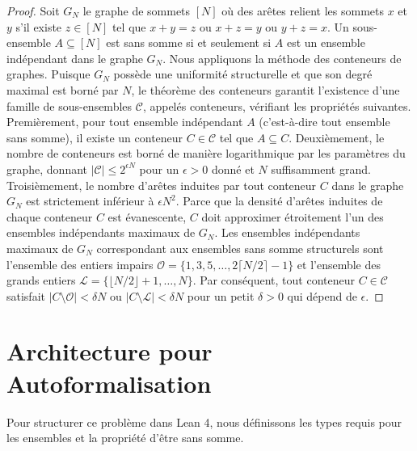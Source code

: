\documentclass[12pt, a4paper]{article}
\begin{document}
\begin{proof}
Soit $G_N$ le graphe de sommets $[N]$ o\`u des ar\^etes relient les sommets $x$ et $y$ s'il existe $z \in [N]$ tel que $x+y=z$ ou $x+z=y$ ou $y+z=x$.
Un sous-ensemble $A \subseteq [N]$ est sans somme si et seulement si $A$ est un ensemble ind\'ependant dans le graphe $G_N$.
Nous appliquons la m\'ethode des conteneurs de graphes. Puisque $G_N$ poss\`ede une uniformit\'e structurelle et que son degr\'e maximal est born\'e par $N$, le th\'eor\`eme des conteneurs garantit l'existence d'une famille de sous-ensembles $\mathcal{C}$, appel\'es conteneurs, v\'erifiant les propri\'et\'es suivantes.
Premi\`erement, pour tout ensemble ind\'ependant $A$ (c'est-\`a-dire tout ensemble sans somme), il existe un conteneur $C \in \mathcal{C}$ tel que $A \subseteq C$.
Deuxi\`emement, le nombre de conteneurs est born\'e de mani\`ere logarithmique par les param\`etres du graphe, donnant $|\mathcal{C}| \le 2^{\epsilon N}$ pour un $\epsilon > 0$ donn\'e et $N$ suffisamment grand.
Troisi\`emement, le nombre d'ar\^etes induites par tout conteneur $C$ dans le graphe $G_N$ est strictement inf\'erieur \`a $\epsilon N^2$.
Parce que la densit\'e d'ar\^etes induites de chaque conteneur $C$ est \'evanescente, $C$ doit approximer \'etroitement l'un des ensembles ind\'ependants maximaux de $G_N$.
Les ensembles ind\'ependants maximaux de $G_N$ correspondant aux ensembles sans somme structurels sont l'ensemble des entiers impairs $\mathcal{O} = \{1, 3, 5, \dots, 2\lceil N/2 \rceil - 1\}$ et l'ensemble des grands entiers $\mathcal{L} = \{\lfloor N/2 \rfloor + 1, \dots, N\}$.
Par cons\'equent, tout conteneur $C \in \mathcal{C}$ satisfait $|C \setminus \mathcal{O}| < \delta N$ ou $|C \setminus \mathcal{L}| < \delta N$ pour un petit $\delta > 0$ qui d\'epend de $\epsilon$.
\end{proof}

\section{Architecture pour Autoformalisation}

Pour structurer ce probl\`eme dans Lean 4, nous d\'efinissons les types requis pour les ensembles et la propri\'et\'e d'\^etre sans somme.
\end{document}
